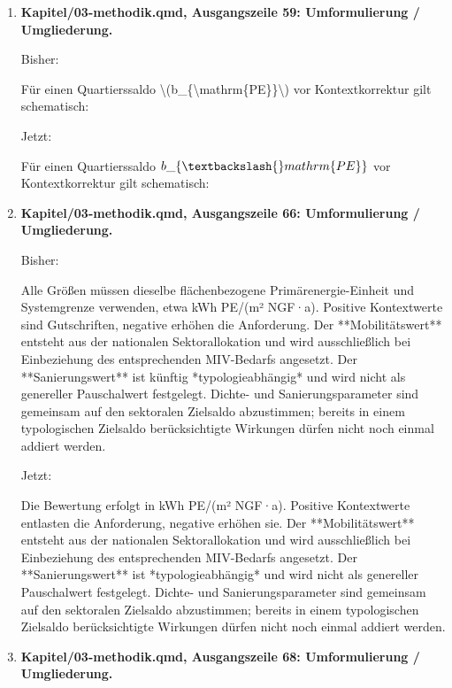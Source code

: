 \documentclass[
  ngerman,
  a4paper,
  DIV=11]{scrreprt}
\newenvironment{Shaded}{\begin{snugshade}}{\end{snugshade}}
\newcommand{\NormalTok}[1]{\textcolor[rgb]{0.00,0.23,0.31}{#1}}
\begin{document}
\begin{enumerate}
\def\labelenumi{\arabic{enumi}.}
\setcounter{enumi}{23}
\item
  \textbf{Kapitel/03-methodik.qmd, Ausgangszeile 59: Umformulierung /
  Umgliederung.}

  Bisher:

\begin{Shaded}
\begin{Highlighting}[]
\NormalTok{Für einen Quartierssaldo \textbackslash{}(b\_\{\textbackslash{}mathrm\{PE\}\}\textbackslash{}) vor Kontextkorrektur gilt schematisch:}
\end{Highlighting}
\end{Shaded}

  Jetzt:

\begin{Shaded}
\begin{Highlighting}[]
\NormalTok{Für einen Quartierssaldo $b\_\{\textbackslash{}mathrm\{PE\}\}$ vor Kontextkorrektur gilt schematisch:}
\end{Highlighting}
\end{Shaded}
\item
  \textbf{Kapitel/03-methodik.qmd, Ausgangszeile 66: Umformulierung /
  Umgliederung.}

  Bisher:

\begin{Shaded}
\begin{Highlighting}[]
\NormalTok{Alle Größen müssen dieselbe flächenbezogene Primärenergie{-}Einheit und Systemgrenze verwenden, etwa kWh PE/(m² NGF·a). Positive Kontextwerte sind Gutschriften, negative erhöhen die Anforderung. Der **Mobilitätswert** entsteht aus der nationalen Sektorallokation und wird ausschließlich bei Einbeziehung des entsprechenden MIV{-}Bedarfs angesetzt. Der **Sanierungswert** ist künftig *typologieabhängig* und wird nicht als genereller Pauschalwert festgelegt. Dichte{-} und Sanierungsparameter sind gemeinsam auf den sektoralen Zielsaldo abzustimmen; bereits in einem typologischen Zielsaldo berücksichtigte Wirkungen dürfen nicht noch einmal addiert werden.}
\end{Highlighting}
\end{Shaded}

  Jetzt:

\begin{Shaded}
\begin{Highlighting}[]
\NormalTok{Die Bewertung erfolgt in kWh PE/(m² NGF·a). Positive Kontextwerte entlasten die Anforderung, negative erhöhen sie. Der **Mobilitätswert** entsteht aus der nationalen Sektorallokation und wird ausschließlich bei Einbeziehung des entsprechenden MIV{-}Bedarfs angesetzt. Der **Sanierungswert** ist *typologieabhängig* und wird nicht als genereller Pauschalwert festgelegt. Dichte{-} und Sanierungsparameter sind gemeinsam auf den sektoralen Zielsaldo abzustimmen; bereits in einem typologischen Zielsaldo berücksichtigte Wirkungen dürfen nicht noch einmal addiert werden.}
\end{Highlighting}
\end{Shaded}
\item
  \textbf{Kapitel/03-methodik.qmd, Ausgangszeile 68: Umformulierung /
  Umgliederung.}


\end{enumerate}
\end{document}
